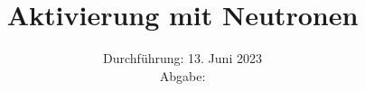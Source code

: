 

\subject{\texorpdfstring{\vspace{2ex}}{}V702\texorpdfstring{\vspace{-2ex}}{}} %
\title{Aktivierung mit Neutronen} %
\date{
	Durchführung: 13. Juni 2023 %
	\\ Abgabe:%
}




\maketitle
\thispagestyle{empty}


\tableofcontents
\newpage







\printbibliography{}

\newpage



